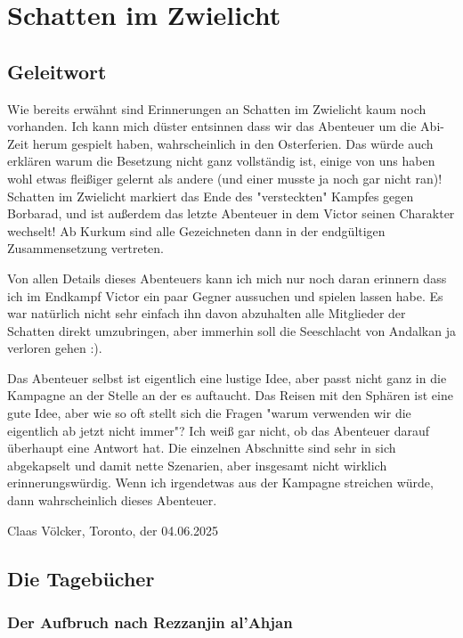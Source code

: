 \chapter{Schatten im Zwielicht}

\section{Geleitwort}

Wie bereits erwähnt sind Erinnerungen an Schatten im Zwielicht kaum noch vorhanden.
Ich kann mich düster entsinnen dass wir das Abenteuer um die Abi-Zeit herum gespielt haben, wahrscheinlich in den Osterferien.
Das würde auch erklären warum die Besetzung nicht ganz vollständig ist, einige von uns haben wohl etwas fleißiger gelernt als andere (und einer musste ja noch gar nicht ran)!
Schatten im Zwielicht markiert das Ende des "versteckten" Kampfes gegen Borbarad, und ist außerdem das letzte Abenteuer in dem Victor seinen Charakter wechselt!
Ab Kurkum sind alle Gezeichneten dann in der endgültigen Zusammensetzung vertreten.

Von allen Details dieses Abenteuers kann ich mich nur noch daran erinnern dass ich im Endkampf Victor ein paar Gegner aussuchen und spielen lassen habe.
Es war natürlich nicht sehr einfach ihn davon abzuhalten alle Mitglieder der Schatten direkt umzubringen, aber immerhin soll die Seeschlacht von Andalkan ja verloren gehen :).

Das Abenteuer selbst ist eigentlich eine lustige Idee, aber passt nicht ganz in die Kampagne an der Stelle an der es auftaucht.
Das Reisen mit den Sphären ist eine gute Idee, aber wie so oft stellt sich die Fragen "warum verwenden wir die eigentlich ab jetzt nicht immer"?
Ich weiß gar nicht, ob das Abenteuer darauf überhaupt eine Antwort hat.
Die einzelnen Abschnitte sind sehr in sich abgekapselt und damit nette Szenarien, aber insgesamt nicht wirklich erinnerungswürdig.
Wenn ich irgendetwas aus der Kampagne streichen würde, dann wahrscheinlich dieses Abenteuer.


\begin{flushright}
Claas Völcker, Toronto, der 04.06.2025
\end{flushright}


\section{Die Tagebücher}

\subsection{Der Aufbruch nach Rezzanjin al'Ahjan}


